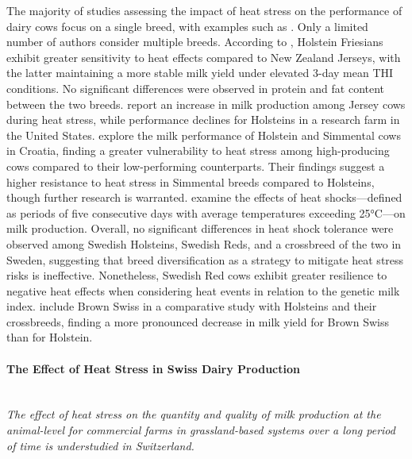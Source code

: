 The majority of studies assessing the impact of heat stress on the performance of dairy cows focus on a single breed, with examples such as \cite{bernabucci_effect_2015, lambertz_climatic_2014,hammami_evaluation_2013, hill_dairy_2015}. Only a limited number of authors consider multiple breeds. According to \cite{bryant_quantifying_2007}, Holstein Friesians exhibit greater sensitivity to heat effects compared to New Zealand Jerseys, with the latter maintaining a more stable milk yield under elevated 3-day mean THI conditions. No significant differences were observed in protein and fat content between the two breeds. \cite{smith_short_2013} report an increase in milk production among Jersey cows during heat stress, while performance declines for Holsteins in a research farm in the United States. \cite{gantner_differences_2017} explore the milk performance of Holstein and Simmental cows in Croatia, finding a greater vulnerability to heat stress among high-producing cows compared to their low-performing counterparts. Their findings suggest a higher resistance to heat stress in Simmental breeds compared to Holsteins, though further research is warranted. \cite{ahmed_temperature_2022} examine the effects of heat shocks—defined as periods of five consecutive days with average temperatures exceeding 25°C—on milk production. Overall, no significant differences in heat shock tolerance were observed among Swedish Holsteins, Swedish Reds, and a crossbreed of the two in Sweden, suggesting that breed diversification as a strategy to mitigate heat stress risks is ineffective. Nonetheless, Swedish Red cows exhibit greater resilience to negative heat effects when considering heat events in relation to the genetic milk index. \cite{cuellar_differences_2023} include Brown Swiss in a comparative study with Holsteins and their crossbreeds, finding a more pronounced decrease in milk yield for Brown Swiss than for Holstein. 

\paragraph{The Effect of Heat Stress in Swiss Dairy Production} \quad \\
\textit{The effect of heat stress on the quantity and quality of milk production at the animal-level for commercial farms in grassland-based systems over a long period of time is understudied in Switzerland.}

